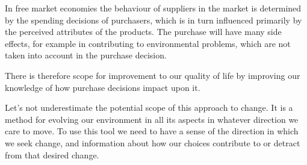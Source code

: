 In free market economies the behaviour of suppliers in the market is determined by the spending decisions of purchasers, which is in turn influenced primarily by the perceived attributes of the products.
The purchase will have many side effects, for example in contributing to environmental problems, which are not taken into account in the purchase decision.

There is therefore scope for improvement to our quality of life by improving our knowledge of how purchase decisions impact upon it.

Let's not underestimate the potential scope of this approach to change.
It is a method for evolving our environment in all its aspects in whatever direction we care to move.
To use this tool we need to have a sense of the direction in which we seek change, and information about how our choices contribute to or detract from that desired change.